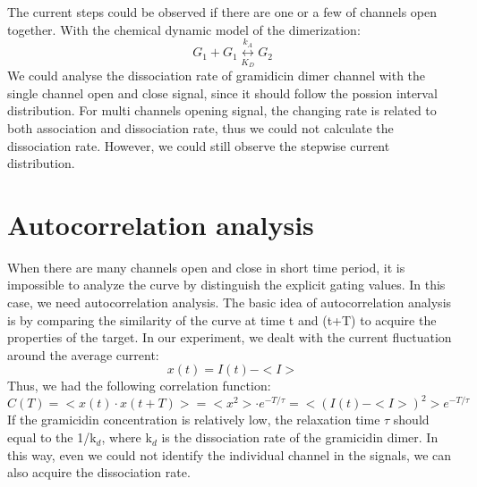 \documentclass[a4paper,english,12pt,bibliography=totoc]{scrreprt}
\begin{document}
The current steps could be observed if there are one or a few of channels open together. With the chemical dynamic model of the dimerization:
\begin{equation}
 G_1+G_1 \overset{k_A}{\underset{K_D}{\leftrightarrow}} G_2
\end{equation}
We could analyse the dissociation rate of gramidicin dimer channel with the single channel open and close signal, since it should follow the possion interval distribution. For multi channels opening signal, the changing rate is related to both association and dissociation rate, thus we could not calculate the dissociation rate. However, we could still observe the stepwise current distribution.

\section{Autocorrelation analysis}
When there are many channels open and close in short time period, it is impossible to analyze the curve by distinguish the explicit gating values. In this case, we need autocorrelation analysis. The basic idea of autocorrelation analysis is by comparing the similarity of the curve at time t and (t+T) to acquire the properties of the target. In our experiment, we dealt with the current fluctuation around the average current:
\begin{equation}
    x(t) = I(t) - <I>
\end{equation}
Thus, we had the following correlation function:
\begin{equation}
    C(T) = <x(t)\cdot x(t+T)> = <x^2> \cdot e^{-T/\tau} = <(I(t)- <I>)^2> e^{-T/\tau}
\end{equation}
If the gramicidin concentration is relatively low, the relaxation time $\tau$
should equal to the 1/k$_d$, where k$_d$ is the dissociation rate of the gramicidin dimer. In this way, even we could not identify the individual channel in the signals, we can also acquire the dissociation rate. 
\end{document}
